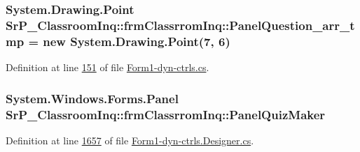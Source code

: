 \hypertarget{class_sr_p___classroom_inq_1_1frm_classrrom_inq_a3e546b9b0c603a788d0316efe572c960}{
\subsubsection[{\-Panel\-Question\-\_\-arr\-\_\-tmp}]{\setlength{\rightskip}{0pt plus 5cm}\-System.\-Drawing.\-Point {\bf \-Sr\-P\-\_\-\-Classroom\-Inq\-::frm\-Classrrom\-Inq\-::\-Panel\-Question\-\_\-arr\-\_\-tmp} = new \-System.\-Drawing.\-Point(7, 6)}}
\label{class_sr_p___classroom_inq_1_1frm_classrrom_inq_a3e546b9b0c603a788d0316efe572c960}


\-Definition at line \hyperlink{_form1-dyn-ctrls_8cs_source_l00151}{151} of file \hyperlink{_form1-dyn-ctrls_8cs_source}{\-Form1-\/dyn-\/ctrls.\-cs}.

\hypertarget{class_sr_p___classroom_inq_1_1frm_classrrom_inq_a1dd9af4cd0caad174e59e9038dcb8868}{
\subsubsection[{\-Panel\-Quiz\-Maker}]{\setlength{\rightskip}{0pt plus 5cm}\-System.\-Windows.\-Forms.\-Panel {\bf \-Sr\-P\-\_\-\-Classroom\-Inq\-::frm\-Classrrom\-Inq\-::\-Panel\-Quiz\-Maker}}}
\label{class_sr_p___classroom_inq_1_1frm_classrrom_inq_a1dd9af4cd0caad174e59e9038dcb8868}


\-Definition at line \hyperlink{_form1-dyn-ctrls_8_designer_8cs_source_l01657}{1657} of file \hyperlink{_form1-dyn-ctrls_8_designer_8cs_source}{\-Form1-\/dyn-\/ctrls.\-Designer.\-cs}.

